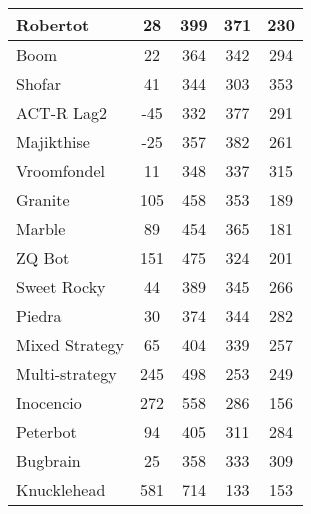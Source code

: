 \begin{table*}
\begin{tabular}{|l|c|c|c|c|}
Robertot & 28 & 399 & 371 & 230 \\ \hline 
Boom & 22 & 364 & 342 & 294 \\ \hline 
Shofar & 41 & 344 & 303 & 353 \\ \hline 
ACT-R Lag2 & -45 & 332 & 377 & 291 \\ \hline 
Majikthise & -25 & 357 & 382 & 261 \\ \hline 
Vroomfondel & 11 & 348 & 337 & 315 \\ \hline 
Granite & 105 & 458 & 353 & 189 \\ \hline 
Marble & 89 & 454 & 365 & 181 \\ \hline 
ZQ Bot & 151 & 475 & 324 & 201 \\ \hline 
Sweet Rocky & 44 & 389 & 345 & 266 \\ \hline 
Piedra & 30 & 374 & 344 & 282 \\ \hline 
Mixed Strategy & 65 & 404 & 339 & 257 \\ \hline 
Multi-strategy & 245 & 498 & 253 & 249 \\ \hline 
Inocencio & 272 & 558 & 286 & 156 \\ \hline 
Peterbot & 94 & 405 & 311 & 284 \\ \hline 
Bugbrain & 25 & 358 & 333 & 309 \\ \hline 
Knucklehead & 581 & 714 & 133 & 153 \\ \hline
        \end{tabular}
    \end{table*}